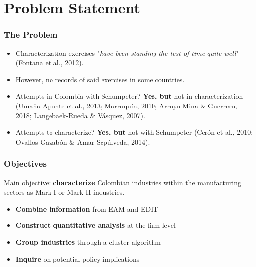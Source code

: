 \documentclass{beamer}
\begin{document}
\section{Problem Statement}
	\begin{frame}[allowframebreaks]
		\frametitle{The Problem}
		\begin{itemize}
			\item Characterization exercises "\textit{have been standing the test of time quite well}" (Fontana et al., 2012).
			\item However, no records of said exercises in some countries.
			\item Attempts in Colombia with Schumpeter? \textbf{Yes, but} not in characterization (Umaña-Aponte et al., 2013; Marroquín, 2010; Arroyo-Mina \& Guerrero, 2018; Langebaek-Rueda \& Vásquez, 2007).
			\item Attempts to characterize? \textbf{Yes, but} not with Schumpeter (Cerón et al., 2010; Ovallos-Gazabón \& Amar-Sepúlveda, 2014).
		\end{itemize}
	\end{frame}
	\begin{frame}
		\frametitle{Objectives}
		Main objective: \textbf{characterize} Colombian industries within the manufacturing sectors as Mark I or Mark II industries.
		\begin{itemize}
			\item \textbf{Combine information} from EAM and EDIT
			\item \textbf{Construct quantitative analysis} at the firm level
			\item \textbf{Group industries} through a cluster algorithm
			\item \textbf{Inquire} on potential policy implications
		\end{itemize}
	\end{frame}
\end{document}
